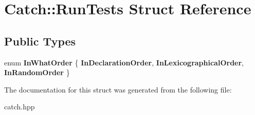 \hypertarget{structCatch_1_1RunTests}{}\section{Catch\+::Run\+Tests Struct Reference}
\label{structCatch_1_1RunTests}
\subsection*{Public Types}
\begin{DoxyCompactItemize}
\item 
\mbox{\label{structCatch_1_1RunTests_ab56bd851b1dd085869992d1a9d73dc5d}} 
enum {\bfseries In\+What\+Order} \{ {\bfseries In\+Declaration\+Order}, 
{\bfseries In\+Lexicographical\+Order}, 
{\bfseries In\+Random\+Order}
 \}
\end{DoxyCompactItemize}


The documentation for this struct was generated from the following file\+:\begin{DoxyCompactItemize}
\item 
catch.\+hpp\end{DoxyCompactItemize}
